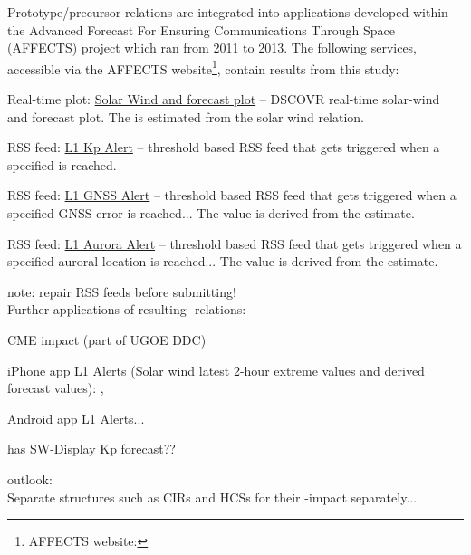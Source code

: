 Prototype/precursor relations are integrated into applications developed within the Advanced Forecast For Ensuring Communications Through Space (\mbox{AFFECTS}) project which ran from 2011 to 2013. The following services, accessible via the \mbox{AFFECTS} website\footnote{AFFECTS website: }, contain results from this \Kp{} study:
\begin{itemize*}
	\item Real-time plot: \href{http://www.affects-fp7.eu/rssfeeds/ace_ap_forecast_plot/ace_realtime_ap_CH_GFT_plot.png}{Solar Wind and \Kp{} forecast plot} -- DSCOVR real-time solar-wind and \Kp{} forecast plot. The \Kp{} is estimated from the solar wind relation.
	\item RSS feed: \href{http://www.affects-fp7.eu/rssfeeds/rssfeed_kp/rssfeed_kp.xml}{L1 Kp Alert} -- threshold based RSS feed that gets triggered when a specified \Kp{} is reached.
	\item RSS feed: \href{http://www.affects-fp7.eu/rssfeeds/rssfeed_gnss/rssfeed_gnss.xml}{L1 GNSS Alert} -- threshold based RSS feed that gets triggered when a specified GNSS error is reached... The value is derived from the \Kp{} estimate.
	\item RSS feed: \href{http://www.affects-fp7.eu/rssfeeds/rssfeed_aurora/rssfeed_aurora.xml}{L1 Aurora Alert} -- threshold based RSS feed that gets triggered when a specified auroral location is reached... The value is derived from the \Kp{} estimate.
\end{itemize*}

note: repair RSS feeds before submitting!\\

\noindent Further applications of resulting \Kp{}-relations:
\begin{itemize*}
	\item CME \Kp{} impact (part of UGOE DDC)
	\item iPhone app L1 Alerts (Solar wind latest 2-hour extreme values and derived forecast values): , 
	\item Android app L1 Alerts... 
	\item has SW-Display Kp forecast??
\end{itemize*}

outlook:\\
Separate structures such as CIRs and HCSs for their \Kp-impact separately...\\

